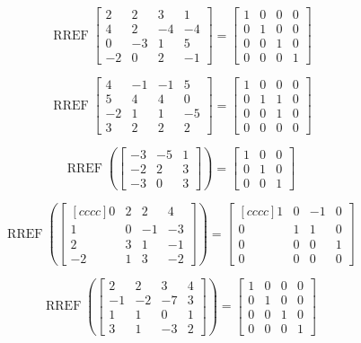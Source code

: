 \documentclass{article}
\DeclareMathOperator{\RREF}{RREF}
\begin{document}
	\[\
\RREF \begin{bmatrix}2 & 2 & 3 & 1 \\ 4 & 2 & -4 & -4 \\ 0 & -3 & 1 & 5 \\ -2 & 0 & 2 & -1\end{bmatrix}
= \begin{bmatrix} 1 & 0 & 0 & 0 \\ 0 & 1 & 0 & 0 \\ 0 & 0 & 1 & 0 \\ 0 & 0 & 0 & 1 \end{bmatrix}
\]

	\[\
\RREF \begin{bmatrix}4 & -1 & -1 & 5 \\ 5 & 4 & 4 & 0 \\ -2 & 1 & 1 & -5 \\ 3 & 2 & 2 & 2\end{bmatrix}
= \begin{bmatrix} 1 & 0 & 0 & 0 \\ 0 & 1 & 1 & 0 \\ 0 & 0 & 1 & 0 \\ 0 & 0 & 0 & 0 \end{bmatrix}
\]

  \[
  \RREF \left( \begin{bmatrix}
    -3 & -5 & 1  \\
    -2 & 2 & 3  \\
    -3 & 0 & 3 
  \end{bmatrix} \right) = \begin{bmatrix}
    1 & 0 & 0  \\
    0 & 1 & 0  \\
    0 & 0 & 1  
  \end{bmatrix}
\]


 \[\RREF\left( \begin{bmatrix}[cccc]
0 & 2 & 2 & 4 \\
1 & 0 & -1 & -3  \\
2 & 3 & 1 & -1 \\
-2 & 1 & 3 & -2 
\end{bmatrix} \right) 
= \begin{bmatrix}[cccc] 
1 & 0 & -1 & 0   \\
0 & 1 & 1 & 0  \\
0 & 0 & 0 & 1 \\
0 & 0 & 0 & 0 
\end{bmatrix}
\] 

  \[\RREF \left( 
\begin{bmatrix} 
2 & 2 & 3 & 4 \\ 
-1 & -2 & -7 & 3 \\ 
1 & 1 & 0 & 1 \\ 
3 & 1 & -3 & 2 
\end{bmatrix} \right) = 
\begin{bmatrix} 
1 & 0 & 0 & 0 \\ 
0 & 1 & 0 & 0 \\ 
0 & 0 & 1 & 0 \\ 
0 & 0 & 0 & 1
\end{bmatrix}\]
\end{document}
